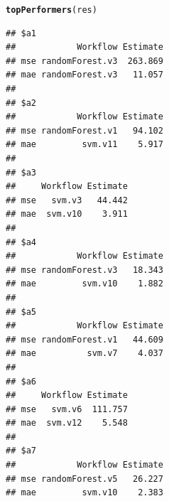 \documentclass[10pt,a4paper]{article}\usepackage[]{graphicx}\usepackage[]{color}
\makeatletter
\newcommand{\hlstd}[1]{\textcolor[rgb]{0.345,0.345,0.345}{#1}}%
\newcommand{\hlkwd}[1]{\textcolor[rgb]{0.737,0.353,0.396}{\textbf{#1}}}%
\newenvironment{kframe}{%
 \def\at@end@of@kframe{}%
 \ifinner\ifhmode%
  \def\at@end@of@kframe{\end{minipage}}%
  \begin{minipage}{\columnwidth}%
 \fi\fi%
 \def\FrameCommand##1{\hskip\@totalleftmargin \hskip-\fboxsep
 \colorbox{shadecolor}{##1}\hskip-\fboxsep
     \hskip-\linewidth \hskip-\@totalleftmargin \hskip\columnwidth}%
 \MakeFramed {\advance\hsize-\width
   \@totalleftmargin\z@ \linewidth\hsize
   \@setminipage}}%
 {\par\unskip\endMakeFramed%
 \at@end@of@kframe}
\newenvironment{knitrout}{}{} %
\makeatother
\begin{document}
\begin{knitrout}\scriptsize
{}\color{fgcolor}\begin{kframe}
\begin{alltt}
\hlkwd{topPerformers}\hlstd{(res)}
\end{alltt}
\begin{verbatim}
## $a1
##            Workflow Estimate
## mse randomForest.v3  263.869
## mae randomForest.v3   11.057
## 
## $a2
##            Workflow Estimate
## mse randomForest.v1   94.102
## mae         svm.v11    5.917
## 
## $a3
##     Workflow Estimate
## mse   svm.v3   44.442
## mae  svm.v10    3.911
## 
## $a4
##            Workflow Estimate
## mse randomForest.v3   18.343
## mae         svm.v10    1.882
## 
## $a5
##            Workflow Estimate
## mse randomForest.v1   44.609
## mae          svm.v7    4.037
## 
## $a6
##     Workflow Estimate
## mse   svm.v6  111.757
## mae  svm.v12    5.548
## 
## $a7
##            Workflow Estimate
## mse randomForest.v5   26.227
## mae         svm.v10    2.383
\end{verbatim}
\end{kframe}
\end{knitrout}
\end{document}
